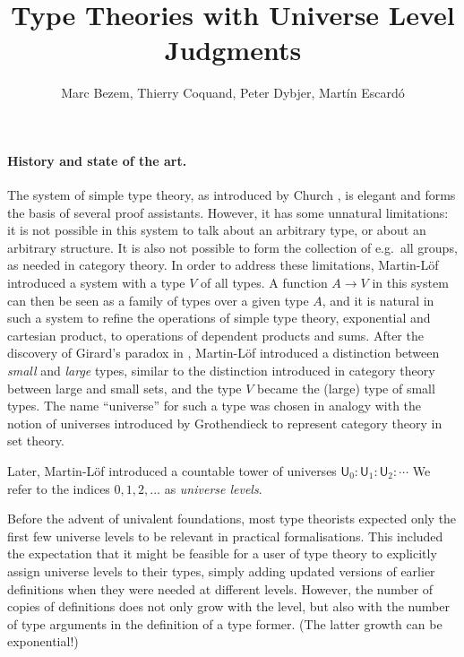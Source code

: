 \documentclass[11pt,a4paper]{article}
\theoremstyle{definition}
\def\UU{\mathsf{U}}
\begin{document}
\title{Type Theories with Universe Level Judgments}

\author{Marc Bezem, Thierry Coquand, Peter Dybjer, Mart\'in Escard\'o}
\date{}
\maketitle


\section*{}\label{sec:intros}
\newcommand{\ttt}[1]{\text{\tt #1}}

\paragraph{History and state of the art.} 
The system of simple type theory, as introduced by Church \cite{church:formulation},
is elegant and forms the basis of several proof assistants. 
However, it has some unnatural limitations: it is not possible in this system to talk
about an arbitrary type, or about an arbitrary structure. 
It is also not possible to form the collection of e.g.\ all groups, 
as needed in category theory. In order to address these limitations, 
Martin-L\"of \cite{ML71,ML71a} introduced a system with a type $V$ of all types. 
A function $A\rightarrow V$ in this system can then be seen as a family of types 
over a given type $A$, and it is natural in such a system to refine
the operations of simple type theory, exponential and cartesian product, 
to operations of dependent products and sums. 
After the discovery of Girard's paradox in \cite{Girard71}, 
Martin-L\"of \cite{ML72} introduced a distinction between
{\em small} and {\em large} types, similar to the distinction introduced 
in category theory between large and small sets,
and the type $V$ became the (large) type of small types.
The name ``universe'' for such a type was chosen in analogy with the notion of 
universes introduced by Grothendieck to represent category theory in set theory.

Later, Martin-L\"of \cite{martinlof:predicative} introduced a countable tower 
of universes $\UU_0 : \UU_1 : \UU_2 : \cdots$
We refer to the indices $0, 1, 2, \ldots$ as {\em universe levels}. 

Before the advent of univalent foundations, most type theorists expected only the first few 
universe levels to be relevant in practical formalisations. 
This included the expectation that it might be feasible for a user of type theory to 
explicitly assign universe levels to their types, simply adding updated versions of earlier
definitions when they were needed at different levels.
However, the number of copies of definitions does not only grow with the level, 
but also with the number of type arguments in the definition of a type former. 
(The latter growth can be exponential!)
\end{document}
